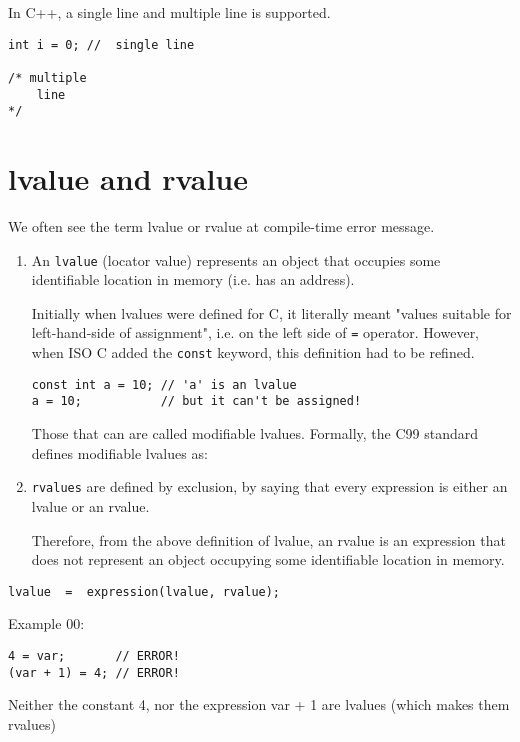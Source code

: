 In C++, a single line and multiple line is supported.
\begin{verbatim}
int i = 0; //  single line

/* multiple 
    line
*/
\end{verbatim}

\section{lvalue and rvalue}
\label{sec:lvalue}
\label{sec:rvalue}

We often see the term lvalue or rvalue at compile-time error message.


\begin{enumerate}
  
  \item  An \verb!lvalue! (locator value) represents an object that occupies some
  identifiable location in memory (i.e. has an address).


Initially when lvalues were defined for C, it literally meant "values suitable
for left-hand-side of assignment", i.e. on the left side of \verb!=! operator.
However, when ISO C added the \verb!const! keyword, this definition had to be
refined.

\begin{lstlisting}
const int a = 10; // 'a' is an lvalue
a = 10;           // but it can't be assigned!
\end{lstlisting}

Those that can are called modifiable lvalues. Formally, the C99 standard defines modifiable lvalues as:


  \item \verb!rvalues! are defined by exclusion, by saying that every expression is
  either an lvalue or an rvalue. 
  
  Therefore, from the above definition of lvalue, an rvalue is an expression
  that does not represent an object occupying some identifiable location in
  memory.
  
\end{enumerate}
\begin{verbatim}
lvalue  =  expression(lvalue, rvalue);
\end{verbatim}

Example 00:
\begin{lstlisting}
4 = var;       // ERROR!
(var + 1) = 4; // ERROR!
\end{lstlisting}
Neither the constant 4, nor the expression var + 1 are lvalues (which makes them rvalues)


